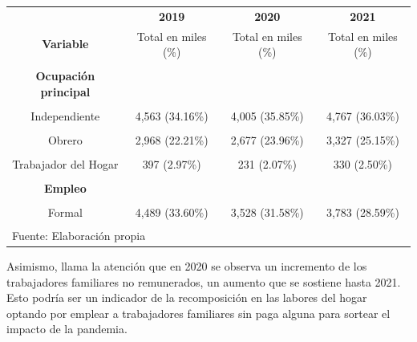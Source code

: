 \documentclass[
  letterpaper,
  12pt,
  oneside,
  spanish,
  doublespacing,
  headsepline,
  parskip]{MastersDoctoralThesis}
\begin{document}
\begin{table}[H]
\begin{tabular}{cccc}
\toprule
\multicolumn{1}{c}{ } & \multicolumn{1}{c}{\textbf{2019}} & \multicolumn{1}{c}{\textbf{2020}} & \multicolumn{1}{c}{\textbf{2021}} \\
\cmidrule(l{3pt}r{3pt}){2-2} \cmidrule(l{3pt}r{3pt}){3-3} \cmidrule(l{3pt}r{3pt}){4-4}
\textbf{Variable} & Total en miles (\%) & Total en miles (\%) & Total en miles (\%)\\
\midrule
\cellcolor{gray!6}{\textbf{Nacional}} & \cellcolor{gray!6}{13,360 (100.00\%)} & \cellcolor{gray!6}{11,172 (100.00\%)} & \cellcolor{gray!6}{13,229 (100.00\%)}\\
\textbf{Ocupación principal} &  &  & \\
\cellcolor{gray!6}{Empleador} & \cellcolor{gray!6}{570 (4.27\%)} & \cellcolor{gray!6}{345 (3.09\%)} & \cellcolor{gray!6}{465 (3.51\%)}\\
Independiente & 4,563 (34.16\%) & 4,005 (35.85\%) & 4,767 (36.03\%)\\
\cellcolor{gray!6}{Empleado} & \cellcolor{gray!6}{4,065 (30.42\%)} & \cellcolor{gray!6}{3,056 (27.35\%)} & \cellcolor{gray!6}{3,479 (26.29\%)}\\
\addlinespace
Obrero & 2,968 (22.21\%) & 2,677 (23.96\%) & 3,327 (25.15\%)\\
\cellcolor{gray!6}{Familiar No Remunerado} & \cellcolor{gray!6}{774 (5.79\%)} & \cellcolor{gray!6}{830 (7.43\%)} & \cellcolor{gray!6}{833 (6.30\%)}\\
Trabajador del Hogar & 397 (2.97\%) & 231 (2.07\%) & 330 (2.50\%)\\
\cellcolor{gray!6}{Otro} & \cellcolor{gray!6}{23 (0.18\%)} & \cellcolor{gray!6}{27 (0.24\%)} & \cellcolor{gray!6}{30 (0.22\%)}\\
\textbf{Empleo} &  &  & \\
\addlinespace
\cellcolor{gray!6}{Informal} & \cellcolor{gray!6}{8,872 (66.40\%)} & \cellcolor{gray!6}{7,643 (68.42\%)} & \cellcolor{gray!6}{9,446 (71.41\%)}\\
Formal & 4,489 (33.60\%) & 3,528 (31.58\%) & 3,783 (28.59\%)\\
\bottomrule
\multicolumn{4}{l}{\textsuperscript{} Fuente: Elaboración propia}\\
\end{tabular}
\endgroup{}
\end{table}

Asimismo, llama la atención que en 2020 se observa un incremento de los
trabajadores familiares no remunerados, un aumento que se sostiene hasta
2021. Esto podría ser un indicador de la recomposición en las labores
del hogar optando por emplear a trabajadores familiares sin paga alguna
para sortear el impacto de la pandemia.
\end{document}
